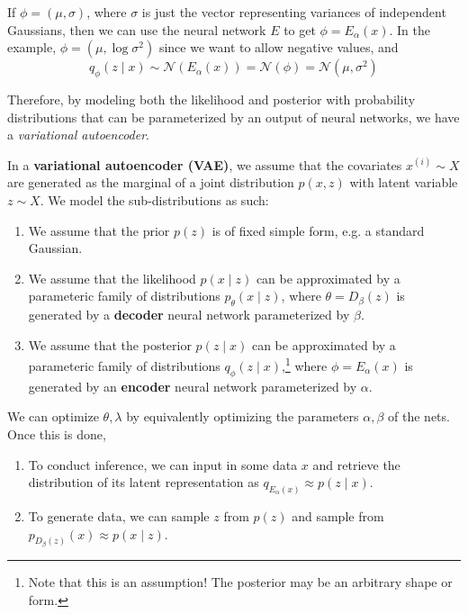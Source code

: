   \begin{example}
    If $\phi = (\mu, \sigma)$, where $\sigma$ is just the vector representing variances of independent Gaussians, then we can use the neural network $E$ to get $\phi = E_{\alpha} (x)$. In the example, $\phi = (\mu, \log \sigma^2)$ since we want to allow negative values, and 
    \begin{equation}
      q_\phi (z \mid x) \sim \mathcal{N}(E_\alpha (x)) = \mathcal{N}(\phi) = \mathcal{N} (\mu, \sigma^2)
    \end{equation}
  \end{example} 

  Therefore, by modeling both the likelihood and posterior with probability distributions that can be parameterized by an output of neural networks, we have a \textit{variational autoencoder}. 

  \begin{definition}
    In a \textbf{variational autoencoder (VAE)}, we assume that the covariates $x^{(i)} \sim X$ are generated as the marginal of a joint distribution $p(x, z)$ with latent variable $z \sim X$. We model the sub-distributions as such: 
    \begin{enumerate}
      \item We assume that the prior $p(z)$ is of fixed simple form, e.g. a standard Gaussian. 
      \item We assume that the likelihood $p(x \mid z)$ can be approximated by a parameteric family of distributions $p_\theta (x \mid z)$, where $\theta = D_\beta (z)$ is generated by a \textbf{decoder} neural network parameterized by $\beta$.
      \item We assume that the posterior $p(z \mid x)$ can be approximated by a parameteric family of distributions $q_\phi (z \mid x)$,\footnote{Note that this is an assumption! The posterior may be an arbitrary shape or form.} where $\phi = E_\alpha (x)$ is generated by an \textbf{encoder} neural network parameterized by $\alpha$.
    \end{enumerate} 
    We can optimize $\theta, \lambda$ by equivalently optimizing the parameters $\alpha, \beta$ of the nets. Once this is done, 
    \begin{enumerate}
      \item To conduct inference, we can input in some data $x$ and retrieve the distribution of its latent representation as $q_{E_\alpha (x)} \approx p (z \mid x)$. 
      \item To generate data, we can sample $z$ from $p(z)$ and sample from $p_{D_\beta (z)} (x) \approx p (x \mid z)$. 
    \end{enumerate}
  \end{definition} 

